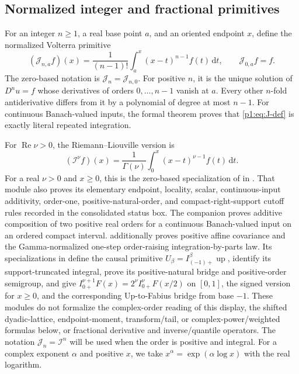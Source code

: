 \documentclass[11pt,oneside]{article}
\theoremstyle{definition}
\theoremstyle{remark}
\newcommand{\Up}{\operatorname{up}}
\newcommand{\dd}{\,\mathrm d}
\newcommand{\Jn}{\mathcal J}
\newcommand{\RL}{\mathcal I}
\newcommand{\1}{\mathbf 1}
\DeclareMathOperator{\Rea}{Re}
\begin{document}
\subsection{Normalized integer and fractional primitives}
For an integer \(n\geq1\), a real base point \(a\), and an oriented endpoint
\(x\), define the normalized Volterra primitive
\begin{equation}
 (\Jn_{n,a}f)(x)=\frac1{(n-1)!}\int_a^x(x-t)^{n-1}f(t)\dd t,
 \qquad \Jn_{0,a}f=f.                                         \label{p1:eq:J-def}
\end{equation}
The zero-based notation is \(\Jn_n=\Jn_{n,0}\).  For positive \(n\), it is
the unique solution of \(D^n u=f\) whose derivatives of orders
\(0,\dots,n-1\) vanish at \(a\).  Every other \(n\)-fold antiderivative differs
from it by a polynomial of degree at most \(n-1\).  For continuous
Banach-valued inputs, the formal theorem
 proves that
\eqref{p1:eq:J-def} is exactly literal repeated integration.

For \(\Rea\nu>0\), the Riemann--Liouville version is
\begin{equation}
 (\RL^\nu f)(x)=\frac1{\Gamma(\nu)}
 \int_0^x(x-t)^{\nu-1}f(t)\dd t.                               \label{p1:eq:RL-def}
\end{equation}
For a real \(\nu>0\) and \(x\ge0\), this is the zero-based specialization of
 in .  That module also
proves its elementary endpoint, locality, scalar, continuous-input additivity, order-one,
positive-natural-order, and compact-right-support cutoff rules recorded in the consolidated
status box.  The companion
 proves additive composition of two
positive real orders for a continuous Banach-valued input on an ordered compact interval.
 additionally proves positive affine
covariance and the Gamma-normalized one-step order-raising integration-by-parts law.
Its specializations in  define the causal
primitive \(U_\beta=I_{(-1)+}^{\beta}\Up\), identify its support-truncated integral, prove
its positive-natural bridge and positive-order semigroup, and give
\(
 I_{0+}^{\nu+1}F(x)=2^\nu I_{0+}^{\nu}F(x/2)
\)
on \([0,1]\), the signed version for $x\ge0$, and the corresponding Up-to-Fabius bridge
from base $-1$.  These modules do not formalize the complex-order reading of this display,
the shifted dyadic-lattice, endpoint-moment, transform/tail, or complex-power/weighted
formulas below, or fractional derivative and inverse/quantile operators.
The notation \(\Jn_n=\RL^n\) will be used when the order is positive and
integral.
For a complex exponent \(\alpha\) and positive \(x\), we take
\(x^\alpha=\exp(\alpha\log x)\) with the real logarithm.
\end{document}
